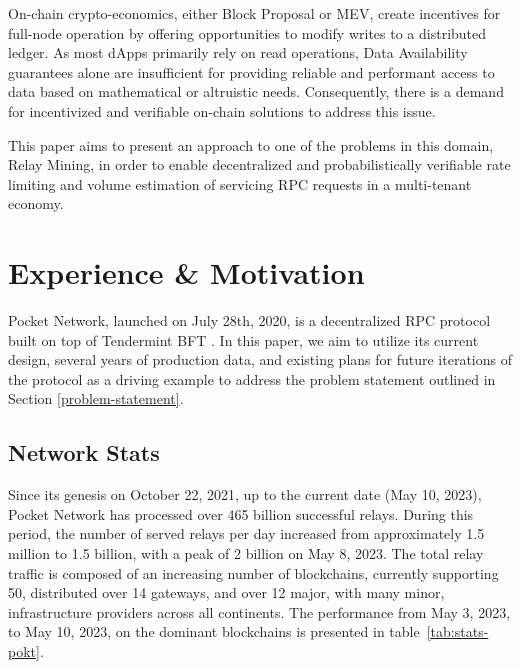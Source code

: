 \documentclass[runningheads]{llncs}
\begin{document}
On-chain crypto-economics, either Block Proposal or MEV, create incentives for full-node operation by offering opportunities to modify writes to a distributed ledger. As most dApps primarily rely on read operations, Data Availability guarantees alone are insufficient for providing reliable and performant access to data based on mathematical or altruistic needs. Consequently, there is a demand for incentivized and verifiable on-chain solutions to address this issue.

This paper aims to present an approach to one of the problems in this domain, Relay Mining, in order to enable decentralized and probabilistically verifiable rate limiting and volume estimation of servicing RPC requests in a multi-tenant economy.

\section{Experience \& Motivation}

Pocket Network, launched on July 28th, 2020, is a decentralized RPC protocol built on top of Tendermint BFT \cite{tendermint}. In this paper, we aim to utilize its current design, several years of production data, and existing plans for future iterations of the protocol as a driving example to address the problem statement outlined in Section \ref{problem-statement}.

\subsection{Network Stats}\label{network-stats}

Since its genesis on October 22, 2021, up to the current date (May 10, 2023), Pocket Network has processed over 465 billion successful relays. During this period, the number of served relays per day increased from approximately 1.5 million to 1.5 billion, with a peak of 2 billion on May 8, 2023. The total relay traffic is composed of an increasing number of blockchains, currently supporting 50, distributed over 14 gateways, and over 12 major, with many minor, infrastructure providers across all continents. The performance from May 3, 2023, to May 10, 2023, on the dominant blockchains is presented in table~\ref{tab:stats-pokt}.
\end{document}
